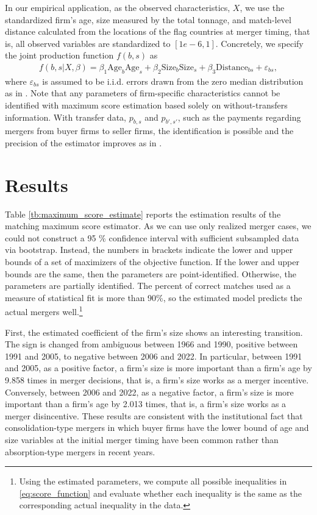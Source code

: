 \documentclass[10pt]{article}
\begin{document}
In our empirical application, as the observed characteristics, $X$, we use the standardized firm's age, size measured by the total tonnage, and match-level distance calculated from the locations of the flag countries at merger timing, that is, all observed variables are standardized to $[1e-6,1]$. 
Concretely, we specify the joint production function $f(b,s)$ as
\begin{align}
    f(b,s|X,\beta)= \beta_1 \text{Age}_{b}\text{Age}_{s} + \beta_2 \text{Size}_{b}\text{Size}_{s} + \beta_3 \text{Distance}_{bs} + \varepsilon_{bs},\label{eq:joint_production}
\end{align}
where $\varepsilon_{bs}$ is assumed to be i.i.d. errors drawn from the zero median distribution as in \cite{fox2018qe}. 
Note that any parameters of firm-specific characteristics cannot be identified with maximum score estimation based solely on without-transfers information. With transfer data, $p_{b,s}$ and $p_{b',s'}$, such as the payments regarding mergers from buyer firms to seller firms, the identification is possible and the precision of the estimator improves as in \cite{akkus2015ms}.


\section{Results}\label{sec:results}

Table \ref{tb:maximum_score_estimate} reports the estimation results of the matching maximum score estimator. 
As we can use only realized merger cases, we could not construct a 95 \% confidence interval with sufficient subsampled data via bootstrap.
Instead, the numbers in brackets indicate the lower and upper bounds of a set of maximizers of the objective function. 
If the lower and upper bounds are the same, then the parameters are point-identified. 
Otherwise, the parameters are partially identified.
The percent of correct matches used as a measure of statistical fit is more than 90\%, so the estimated model predicts the actual mergers well.\footnote{Using the estimated parameters, we compute all possible inequalities in \eqref{eq:score_function} and evaluate whether each inequality is the same as the corresponding actual inequality in the data.}

First, the estimated coefficient of the firm's size shows an interesting transition. 
The sign is changed from ambiguous between 1966 and 1990, positive between 1991 and 2005, to negative between 2006 and 2022. 
In particular, between 1991 and 2005, as a positive factor, a firm's size is more important than a firm's age by 9.858 times in merger decisions, that is, a firm's size works as a merger incentive.
Conversely, between 2006 and 2022, as a negative factor, a firm's size is more important than a firm's age by 2.013 times, that is, a firm's size works as a merger disincentive.
These results are consistent with the institutional fact that consolidation-type mergers in which buyer firms have the lower bound of age and size variables at the initial merger timing have been common rather than absorption-type mergers in recent years.
\end{document}
